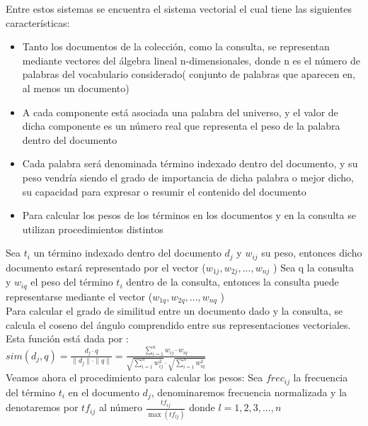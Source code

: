 \documentclass[12pt]{article}
\begin{document}
     Entre estos sistemas se encuentra el sistema vectorial el cual tiene las siguientes caracter\'isticas:
     \begin{itemize}
     	\item Tanto los documentos de la colecci\'on, como la consulta, se representan mediante vectores del \'algebra lineal n-dimensionales, donde n es el n\'umero de palabras del vocabulario considerado( conjunto de palabras que aparecen en, al menos un documento)
     	
     	\item A cada componente est\'a asociada una palabra del universo, y el valor de dicha componente es un n\'umero real que representa el peso de la palabra dentro del documento
     	
     	\item Cada palabra ser\'a denominada t\'ermino indexado dentro del documento, y su peso vendr\'ia siendo el grado de importancia de dicha palabra o mejor dicho, su capacidad
     	 para expresar o resumir el contenido del documento 
     	 
     	\item Para calcular los pesos de los t\'erminos en los documentos y en la consulta se utilizan procedimientos distintos
     \end{itemize}
     
     Sea $t_{i}$ un t\'ermino indexado dentro del documento $d_{j}$ y $w_{ij}$ su peso, entonces dicho documento estar\'a representado por el vector ($w_{1j}, w_{2j},..., w_{nj}$ )
   Sea q la consulta y $w_{iq}$ el peso del t\'ermino $t_{i}$ dentro de la consulta, entonces la consulta puede representarse mediante el vector ($w_{1q}, w_{2q},..., w_{nq}$ )\\
   
   Para calcular el grado de similitud entre un documento dado y la consulta, se calcula el coseno del \'angulo comprendido entre sus representaciones vectoriales.
   Esta funci\'on est\'a dada por :\\
   $sim(d_{j}, q)= \frac{ d_{j} \cdot q}{\|d_{j}\| \cdot \|{q}\| } = \frac{ \sum_{i=1}^{n} w_{ij} \cdot w_{iq}}{ \sqrt{\sum_{i=1}^{n} w_{ij}^{2}} \cdot \sqrt{\sum_{i=1}^{n} w_{iq}^{2}}}$ \\
   
    Veamos ahora el procedimiento para calcular los pesos:
   Sea $frec_{ij}$ la frecuencia del t\'ermino $t_{i}$ en el documento $d_{j}$, denominaremos frecuencia normalizada y la denotaremos por $tf_{ij}$ al n\'umero $\frac{tf_{ij}}{\max(tf_{lj}) }$ donde $l= 1, 2, 3, ..., n$\\
   
\end{document}
